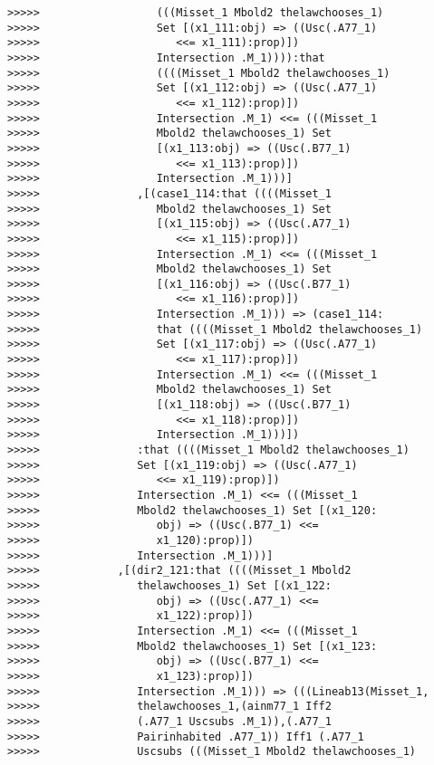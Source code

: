 \documentclass[12pt]{article}
\begin{document}
\begin{verbatim}
>>>>>                  (((Misset_1 Mbold2 thelawchooses_1)
>>>>>                  Set [(x1_111:obj) => ((Usc(.A77_1)
>>>>>                     <<= x1_111):prop)])
>>>>>                  Intersection .M_1)))):that
>>>>>                  ((((Misset_1 Mbold2 thelawchooses_1)
>>>>>                  Set [(x1_112:obj) => ((Usc(.A77_1)
>>>>>                     <<= x1_112):prop)])
>>>>>                  Intersection .M_1) <<= (((Misset_1
>>>>>                  Mbold2 thelawchooses_1) Set
>>>>>                  [(x1_113:obj) => ((Usc(.B77_1)
>>>>>                     <<= x1_113):prop)])
>>>>>                  Intersection .M_1)))]
>>>>>               ,[(case1_114:that ((((Misset_1
>>>>>                  Mbold2 thelawchooses_1) Set
>>>>>                  [(x1_115:obj) => ((Usc(.A77_1)
>>>>>                     <<= x1_115):prop)])
>>>>>                  Intersection .M_1) <<= (((Misset_1
>>>>>                  Mbold2 thelawchooses_1) Set
>>>>>                  [(x1_116:obj) => ((Usc(.B77_1)
>>>>>                     <<= x1_116):prop)])
>>>>>                  Intersection .M_1))) => (case1_114:
>>>>>                  that ((((Misset_1 Mbold2 thelawchooses_1)
>>>>>                  Set [(x1_117:obj) => ((Usc(.A77_1)
>>>>>                     <<= x1_117):prop)])
>>>>>                  Intersection .M_1) <<= (((Misset_1
>>>>>                  Mbold2 thelawchooses_1) Set
>>>>>                  [(x1_118:obj) => ((Usc(.B77_1)
>>>>>                     <<= x1_118):prop)])
>>>>>                  Intersection .M_1)))])
>>>>>               :that ((((Misset_1 Mbold2 thelawchooses_1)
>>>>>               Set [(x1_119:obj) => ((Usc(.A77_1)
>>>>>                  <<= x1_119):prop)])
>>>>>               Intersection .M_1) <<= (((Misset_1
>>>>>               Mbold2 thelawchooses_1) Set [(x1_120:
>>>>>                  obj) => ((Usc(.B77_1) <<=
>>>>>                  x1_120):prop)])
>>>>>               Intersection .M_1)))]
>>>>>            ,[(dir2_121:that ((((Misset_1 Mbold2
>>>>>               thelawchooses_1) Set [(x1_122:
>>>>>                  obj) => ((Usc(.A77_1) <<=
>>>>>                  x1_122):prop)])
>>>>>               Intersection .M_1) <<= (((Misset_1
>>>>>               Mbold2 thelawchooses_1) Set [(x1_123:
>>>>>                  obj) => ((Usc(.B77_1) <<=
>>>>>                  x1_123):prop)])
>>>>>               Intersection .M_1))) => (((Lineab13(Misset_1,
>>>>>               thelawchooses_1,(ainm77_1 Iff2
>>>>>               (.A77_1 Uscsubs .M_1)),(.A77_1
>>>>>               Pairinhabited .A77_1)) Iff1 (.A77_1
>>>>>               Uscsubs (((Misset_1 Mbold2 thelawchooses_1)

\end{verbatim}
\end{document}
